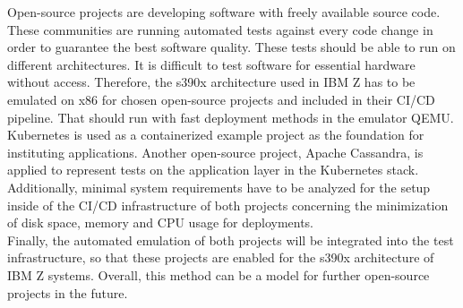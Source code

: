 Open-source projects are developing software with freely available source code. These communities are running automated tests against every code change in order to guarantee the best software quality. 
These tests should be able to run on different architectures. It is difficult to test software for essential hardware without access. Therefore, the \gls{s390x} architecture used in IBM Z has to be emulated on x86 for chosen open-source projects and included in their \gls{CI/CD} pipeline. 
That should run with fast deployment methods in the \gls{emulator} QEMU. 
Kubernetes is used as a \gls{containerized} example project as the foundation for instituting applications. Another open-source project, Apache Cassandra, is applied to represent tests on the \gls{application layer} in the Kubernetes stack. \\
Additionally, minimal system requirements have to be analyzed for the setup inside of the CI/CD infrastructure of both projects concerning the minimization of disk space, memory and CPU usage for deployments. \\
Finally, the automated emulation of both projects will be integrated into the test infrastructure, so that these projects are enabled for the s390x architecture of \gls{IBM Z systems}. Overall, this method can be a model for further open-source projects in the future.



